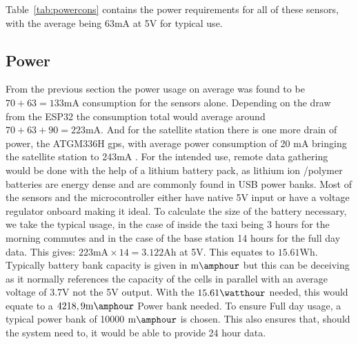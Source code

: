\noindent Table~\ref{tab:powercons} \cite{sen55} contains the power requirements for all of these sensors, with the average being 63mA at 5V for typical use.

\subsection{Power}
From the previous section the power usage on average was found to be $ 70 +  63 = 133\si{\milli\ampere}$ consumption for the sensors alone. Depending on the draw from the ESP32 the consumption total would average around $ 70 +  63 + 90 = 223\si{\milli\ampere}$\cite{wifiespnow}.
And for the satellite station there is one more drain of power, the ATGM336H gps, with average power consumption of 20 mA\cite{atgm336h} bringing the satellite station to 243mA .
%
\noindent
For the intended use, remote data gathering would be done with the help of a lithium battery pack, as lithium ion /polymer batteries are energy dense and are commonly found in USB power banks. Most of the sensors and the microcontroller either have native 5V input or have a voltage regulator onboard making it ideal. To calculate the size of the battery necessary, we take the typical usage, in the case of inside the taxi being 3 hours for the morning commutes and in the case of the base station 14 hours for the full day data. This gives: $223\si{\milli\ampere} \times 14 = 3.122 \si{\ampere\hour} $ at 5V. This equates to $15.61 \si{\watt\hour}$. Typically battery bank capacity is given in $ \si{\milli\amphour} $ but this can be deceiving as it normally references the capacity of the cells in parallel with an average voltage of 3.7V not the 5V output. With the $15.61 \si{\watthour}$ needed, this would equate to a  $ 4218,9\si{\milli\amphour} $ Power bank needed. To ensure Full day usage, a typical power bank of 10000 $ \si{\milli\amphour} $ is chosen. This also ensures that, should the system need to, it would be able to provide 24 hour data.
\pagebreak

